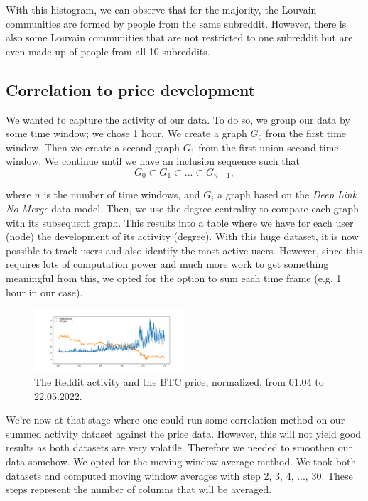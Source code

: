 With this histogram, we can observe that for the majority, the Louvain communities are formed by people from the same subreddit. However, there is also some Louvain communities that are not restricted to one subreddit but are even made up of people from all 10 subreddits.

\subsection{Correlation to price development}

We wanted to capture the activity of our data. To do so, we group our data by some time window; we chose 1 hour. We create a graph $G_0$ from the first time window. Then we create a second graph $G_1$ from the first union second time window. We continue until we have an inclusion sequence such that 
$$ G_0 \subset G_1 \subset  ... \subset G_{n-1},$$

where $n$ is the number of time windows, and $G_i$ a graph based on the \textit{Deep Link No Merge} data model.
Then, we use the degree centrality to compare each graph with its subsequent graph. This results into a table where we have for each user (node) the development of its activity (degree). With this huge dataset, it is now possible to track users and also identify the most active users. However, since this requires lots of computation power and much more work to get something meaningful from this, we opted for the option to sum each time frame (e.g. 1 hour in our case). 

\begin{figure}[H]
    \centering
    \includegraphics[width=0.5\textwidth]{figures/activity_x_price.pdf}
    \caption{The Reddit activity and the BTC price, normalized, from 01.04 to 22.05.2022.}
\end{figure}


We're now at that stage where one could run some correlation method on our summed activity dataset against the price data. However, this will not yield good results as both datasets are very volatile. Therefore we needed to smoothen our data somehow. We opted for the moving window average method. We took both datasets and computed moving window averages with step 2, 3, 4, ..., 30. These steps represent the number of columns that will be averaged. 

